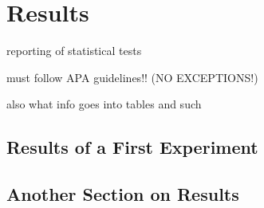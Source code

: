 

\chapter{Results}
\label{chap:results} 


reporting of statistical tests

must follow APA guidelines!! (NO EXCEPTIONS!)

also what info goes into tables and such

\section{Results of a First Experiment}
\label{sec:results-section1}

\lipsum[1-1]

\section{Another Section on Results}
\label{sec:results-section2}

\lipsum[2-4]


